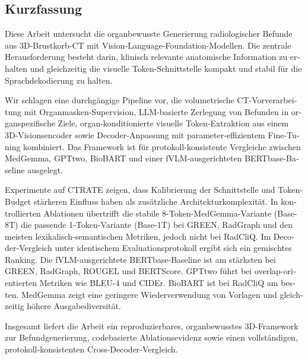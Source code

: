 \begin{otherlanguage}{ngerman}
\chapter{Kurzfassung}

Diese Arbeit untersucht die organbewusste Generierung radiologischer Befunde aus 3D-Brustkorb-CT mit Vision-Language-Foundation-Modellen. Die zentrale Herausforderung besteht darin, klinisch relevante anatomische Information zu erhalten und gleichzeitig die visuelle Token-Schnittstelle kompakt und stabil für die Sprachdekodierung zu halten.

Wir schlagen eine durchgängige Pipeline vor, die volumetrische CT-Vorverarbeitung mit Organmasken-Supervision, LLM-basierte Zerlegung von Befunden in organspezifische Ziele, organ-konditionierte visuelle Token-Extraktion aus einem 3D-Visionsencoder sowie Decoder-Anpassung mit parameter-effizientem Fine-Tuning kombiniert. Das Framework ist für protokoll-konsistente Vergleiche zwischen MedGemma, \ac{GPTtwo}, BioBART und einer fVLM-ausgerichteten \ac{BERTbase}-Baseline ausgelegt.

Experimente auf \ac{CTRATE} zeigen, dass Kalibrierung der Schnittstelle und Token-Budget stärkeren Einfluss haben als zusätzliche Architekturkomplexität. In kontrollierten Ablationen übertrifft die stabile 8-Token-MedGemma-Variante (Base-8T) die passende 1-Token-Variante (Base-1T) bei \ac{GREEN}, \ac{RadGraph} und den meisten lexikalisch-semantischen Metriken, jedoch nicht bei \ac{RadCliQ}. Im Decoder-Vergleich unter identischem Evaluationsprotokoll ergibt sich ein gemischtes Ranking. Die fVLM-ausgerichtete \ac{BERTbase}-Baseline ist am stärksten bei \ac{GREEN}, \ac{RadGraph}, \ac{ROUGEL} und \ac{BERTScore}. \ac{GPTtwo} führt bei overlap-orientierten Metriken wie BLEU-4 und \ac{CIDEr}. BioBART ist bei \ac{RadCliQ} am besten. MedGemma zeigt eine geringere Wiederverwendung von Vorlagen und gleichzeitig höhere Ausgabediversität.

Insgesamt liefert die Arbeit ein reproduzierbares, organbewusstes 3D-Framework zur Befundgenerierung, codebasierte Ablationsevidenz sowie einen vollständigen, protokoll-konsistenten Cross-Decoder-Vergleich.
\end{otherlanguage}
